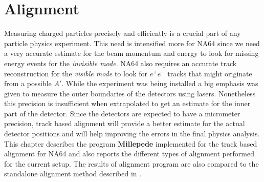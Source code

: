 
\chapter{Alignment}
\label{sec:align}
Measuring charged particles precisely and efficiently is a crucial part of any particle physics experiment. This need is intensified more for NA64 since we need a very accurate estimate for the beam momentum and energy to look for missing energy events for the \textit{invisible mode}. NA64 also requires an accurate track reconstruction for the \textit{visible mode} to look for $e^+ e^-$ tracks that might originate from a possible $A'$. While the experiment was being installed a big emphasis was given to measure the outer boundaries of the detectors using lasers. Nonetheless this precision is insufficient when extrapolated to get an estimate for the inner part of the detector. Since the detectors are expected to have a micrometer precision, track based alignment will provide a better estimate for the actual detector positions and will help improving the errors in the final physics analysis. This chapter describes the program \textbf{Millepede} implemented for the track based alignment for NA64 and also reports the different types of alignment performed for the current setup. The results of alignment program are also compared to the standalone alignment method described in \cite{nabeel:2018}.

